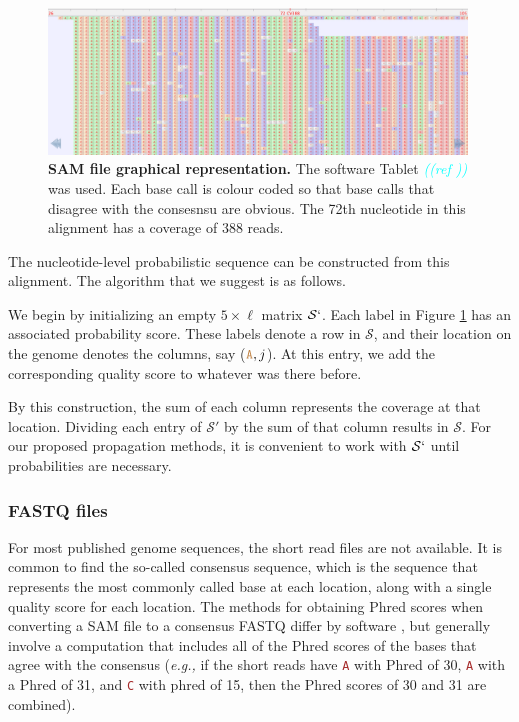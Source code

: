 \documentclass[
]{article}
\newcommand{\comment}[1]{\textsl{\textcolor{cyan}{((#1))}}}
\newcommand{\eg}{\textit{e.g.,}\xspace}
\newcommand{\sq}[1]{\texttt{\textcolor{brown}{#1}}}
\newcommand{\nps}{\mathcal{S}} %
\begin{document}
\begin{figure}[ht]
\centering
    \includegraphics[width=0.99\textwidth]{../ms/figs/sam-tablet.png}
\caption{\textbf{SAM file graphical representation.} The software Tablet \comment{ref } was used. Each base call is colour coded so that base calls that disagree with the consesnsu are obvious. The 72th nucleotide in this alignment has a coverage of 388 reads.}
\label{fig:sam}
\end{figure}

The nucleotide-level probabilistic sequence can be constructed from this
alignment. The algorithm that we suggest is as follows.

We begin by initializing an empty \(5\times\ell\) matrix \(\nps`\). Each
label in Figure \ref{fig:sam} has an associated probability score. These
labels denote a row in \(\nps\), and their location on the genome
denotes the columns, say (\(\sq{A}, j\)). At this entry, we add the
corresponding quality score to whatever was there before.

By this construction, the sum of each column represents the coverage at
that location. Dividing each entry of \(\nps'\) by the sum of that
column results in \(\nps\). For our proposed propagation methods, it is
convenient to work with \(\nps`\) until probabilities are necessary.

\hypertarget{fastq-files}{%
\subsubsection{FASTQ files}\label{fastq-files}}

For most published genome sequences, the short read files are not
available. It is common to find the so-called consensus sequence, which
is the sequence that represents the most commonly called base at each
location, along with a single quality score for each location. The
methods for obtaining Phred scores when converting a SAM file to a
consensus FASTQ differ by software
\citep[\citet{keithSimulatedAnnealingAlgorithm2002},
\citet{liMappingShortDNA2008}]{liAdjustQualityScores2004}, but generally
involve a computation that includes all of the Phred scores of the bases
that agree with the consensus (\eg if the short reads have \sq{A} with
Phred of 30, \sq{A} with a Phred of 31, and \sq{C} with phred of 15,
then the Phred scores of 30 and 31 are combined).
\end{document}
